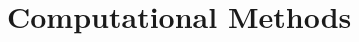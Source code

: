 \documentclass{elsarticle}
\providecommand{\conv}{\text{conv}}
\theoremstyle{remark}
\theoremstyle{definition}
\begin{document}

\section{Computational Methods}\label{sec:computational:methods}
%
%
%
\end{document}
